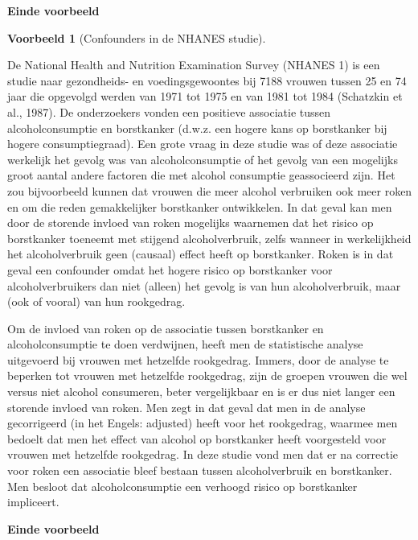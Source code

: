 \documentclass[
  12pt,dutch]{book}
\theoremstyle{definition}
\theoremstyle{definition}
\newtheorem{example}{Voorbeeld}[chapter]
\theoremstyle{definition}
\theoremstyle{definition}
\theoremstyle{remark}
\begin{document}
\textbf{Einde voorbeeld}

\begin{example}[Confounders in de NHANES studie]
\protect\hypertarget{exm:unnamed-chunk-83}{}\label{exm:unnamed-chunk-83}~
\end{example}

De National Health and Nutrition Examination Survey
(NHANES 1) is een studie naar gezondheids- en voedingsgewoontes bij 7188
vrouwen tussen 25 en 74 jaar die opgevolgd werden van 1971 tot 1975 en van
1981 tot 1984 (Schatzkin et al., 1987). De onderzoekers vonden een positieve
associatie tussen alcoholconsumptie en borstkanker (d.w.z. een hogere kans
op borstkanker bij hogere consumptiegraad). Een grote vraag in deze studie
was of deze associatie werkelijk het gevolg was van alcoholconsumptie of het
gevolg van een mogelijks groot aantal andere factoren die met alcohol
consumptie geassocieerd zijn. Het zou bijvoorbeeld kunnen dat vrouwen die
meer alcohol verbruiken ook meer roken en om die reden gemakkelijker
borstkanker ontwikkelen. In dat geval kan men door de storende invloed van
roken mogelijks waarnemen dat het risico op borstkanker toeneemt met
stijgend alcoholverbruik, zelfs wanneer in werkelijkheid het alcoholverbruik
geen (causaal) effect heeft op borstkanker. Roken is in dat geval een
confounder omdat het hogere risico op borstkanker voor alcoholverbruikers
dan niet (alleen) het gevolg is van hun alcoholverbruik, maar (ook of
vooral) van hun rookgedrag.

Om de invloed van roken op de associatie tussen borstkanker en
alcoholconsumptie te doen verdwijnen, heeft men de statistische analyse
uitgevoerd bij vrouwen met hetzelfde rookgedrag. Immers, door de analyse te
beperken tot vrouwen met hetzelfde rookgedrag, zijn de groepen vrouwen die
wel versus niet alcohol consumeren, beter vergelijkbaar en is er dus niet
langer een storende invloed van roken. Men zegt in dat geval dat men in de
analyse gecorrigeerd (in het Engels: adjusted) heeft voor het
rookgedrag, waarmee men bedoelt dat men het effect van alcohol op
borstkanker heeft voorgesteld voor vrouwen met hetzelfde rookgedrag. In deze
studie vond men dat er na correctie voor roken een associatie bleef bestaan
tussen alcoholverbruik en borstkanker. Men besloot dat alcoholconsumptie een
verhoogd risico op borstkanker impliceert.

\textbf{Einde voorbeeld}
\end{document}
